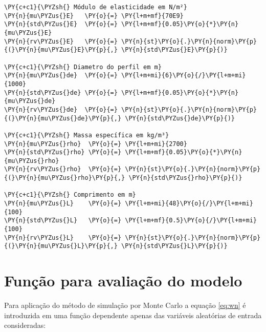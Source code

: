     \begin{tcolorbox}[breakable, size=fbox, boxrule=1pt, pad at break*=1mm,colback=cellbackground, colframe=cellborder]
\begin{Verbatim}[commandchars=\\\{\}]
\PY{c+c1}{\PYZsh{} Módulo de elasticidade em N/m²}
\PY{n}{mu\PYZus{}E}   \PY{o}{=} \PY{l+m+mf}{70E9} 
\PY{n}{std\PYZus{}E}  \PY{o}{=} \PY{l+m+mf}{0.05}\PY{o}{*}\PY{n}{mu\PYZus{}E}
\PY{n}{rv\PYZus{}E}   \PY{o}{=} \PY{n}{st}\PY{o}{.}\PY{n}{norm}\PY{p}{(}\PY{n}{mu\PYZus{}E}\PY{p}{,} \PY{n}{std\PYZus{}E}\PY{p}{)}    

\PY{c+c1}{\PYZsh{} Diametro do perfil em m}
\PY{n}{mu\PYZus{}de}  \PY{o}{=} \PY{l+m+mi}{6}\PY{o}{/}\PY{l+m+mi}{1000}
\PY{n}{std\PYZus{}de} \PY{o}{=} \PY{l+m+mf}{0.05}\PY{o}{*}\PY{n}{mu\PYZus{}de}
\PY{n}{rv\PYZus{}de}  \PY{o}{=} \PY{n}{st}\PY{o}{.}\PY{n}{norm}\PY{p}{(}\PY{n}{mu\PYZus{}de}\PY{p}{,} \PY{n}{std\PYZus{}de}\PY{p}{)}

\PY{c+c1}{\PYZsh{} Massa específica em kg/m³}
\PY{n}{mu\PYZus{}rho}  \PY{o}{=} \PY{l+m+mi}{2700}
\PY{n}{std\PYZus{}rho} \PY{o}{=} \PY{l+m+mf}{0.05}\PY{o}{*}\PY{n}{mu\PYZus{}rho}
\PY{n}{rv\PYZus{}rho}  \PY{o}{=} \PY{n}{st}\PY{o}{.}\PY{n}{norm}\PY{p}{(}\PY{n}{mu\PYZus{}rho}\PY{p}{,} \PY{n}{std\PYZus{}rho}\PY{p}{)}

\PY{c+c1}{\PYZsh{} Comprimento em m}
\PY{n}{mu\PYZus{}L}    \PY{o}{=} \PY{l+m+mi}{48}\PY{o}{/}\PY{l+m+mi}{100}
\PY{n}{std\PYZus{}L}   \PY{o}{=} \PY{l+m+mf}{0.5}\PY{o}{/}\PY{l+m+mi}{100}
\PY{n}{rv\PYZus{}L}    \PY{o}{=} \PY{n}{st}\PY{o}{.}\PY{n}{norm}\PY{p}{(}\PY{n}{mu\PYZus{}L}\PY{p}{,} \PY{n}{std\PYZus{}L}\PY{p}{)} 
\end{Verbatim}
\end{tcolorbox}

    \hypertarget{funuxe7uxe3o-para-avaliauxe7uxe3o-do-modelo}{%
\section{Função para avaliação do
modelo}\label{funuxe7uxe3o-para-avaliauxe7uxe3o-do-modelo}}

Para aplicação do método de simulação por Monte Carlo a equação
\ref{eq:wn} é introduzida em uma função dependente apenas das variáveis
aleatórias de entrada consideradas:

